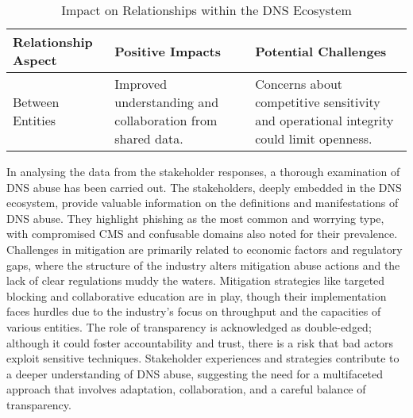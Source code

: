 {

\begin{table}[H]
\centering
\footnotesize 
\begin{tabular}{|l|p{4cm}|p{4cm}|}
\hline
\cellcolor{gray!50}\textbf{Relationship Aspect} & \cellcolor{gray!50}\textbf{Positive Impacts} & \cellcolor{gray!50}\textbf{Potential Challenges} \\
\hline
Between Entities & Improved understanding and collaboration from shared data. & Concerns about competitive sensitivity and operational integrity could limit openness. \\
\hline
\end{tabular}
\caption{Impact on Relationships within the DNS Ecosystem}
\label{table:impact_on_relationships}
\end{table}
}

In analysing the data from the stakeholder responses, a thorough examination of DNS abuse has been carried out. The stakeholders, deeply embedded in the DNS ecosystem, provide valuable information on the definitions and manifestations of DNS abuse. They highlight phishing as the most common and worrying type, with compromised CMS and confusable domains also noted for their prevalence. Challenges in mitigation are primarily related to economic factors and regulatory gaps, where the structure of the industry alters mitigation abuse actions and the lack of clear regulations muddy the waters. Mitigation strategies like targeted blocking and collaborative education are in play, though their implementation faces hurdles due to the industry's focus on throughput and the capacities of various entities. 
The role of transparency is acknowledged as double-edged; although it could foster accountability and trust, there is a risk that bad actors exploit sensitive techniques. Stakeholder experiences and strategies contribute to a deeper understanding of DNS abuse, suggesting the need for a multifaceted approach that involves adaptation, collaboration, and a careful balance of transparency.

